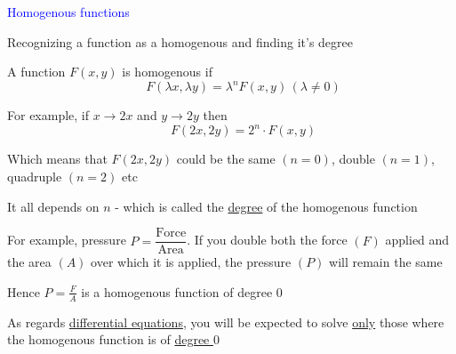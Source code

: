 \documentclass[14pt,fleqn]{extarticle}
\begin{document}
 
\begin{skill}
    \begin{narrow}
         \textcolor{blue}{Homogenous functions}
         
         Recognizing a function as a homogenous and finding it's degree 
    \end{narrow}
    
    \reason 
    
    A function $F(x,y)$ is homogenous if 
    \[ \qquad F \left(\lambda x, \lambda y \right) = \lambda^n F \left(x,y \right)\, (\lambda\neq 0)\]
    
    For example, if $x\to 2x$ and $y\to 2y$ then 
    \[ \qquad F(2x,2y) = 2^n\cdot F(x,y) \]
    
    Which means that $F(2x,2y)$ could be the same $(n=0)$, double $(n=1)$, quadruple $(n=2)$ etc \newline 
    
    It all depends on $n$ - which is called the \underline{degree} of the homogenous function \newline 
    
    For example, pressure $P = \dfrac{\text{Force}}{\text{Area}}$. If you double both the force $(F)$ applied and the area $(A)$ over which it is applied, the pressure $(P)$ will remain the same \newline 
    
    Hence $P=\frac{F}{A}$ is a homogenous function of degree $0$\newline 
    
    As regards \underline{differential equations}, you will be expected to 
    solve \underline{only} those where the homogenous function is of \underline{degree $0$}
\end{skill}
\end{document}
